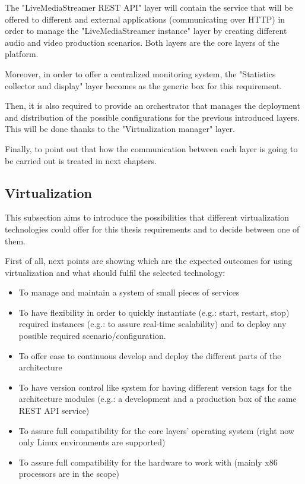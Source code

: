 The "LiveMediaStreamer REST API" layer will contain the service that will be offered to different and external applications (communicating over HTTP) in order to manage the "LiveMediaStreamer instance" layer by creating different audio and video production scenarios. Both layers are the core layers of the platform. 

Moreover, in order to offer a centralized monitoring system, the "Statistics collector and display" layer becomes as the generic box for this requirement.

Then, it is also required to provide an orchestrator that manages the deployment and distribution of the possible configurations for the previous introduced layers. This will be done thanks to the "Virtualization manager" layer.

Finally, to point out that how the communication between each layer is going to be carried out is treated in next chapters.

\subsection{Virtualization}

This subsection aims to introduce the possibilities that different virtualization technologies could offer for this thesis requirements and to decide between one of them.

First of all, next points are showing which are the expected outcomes for using virtualization and what should fulfil the selected technology:

\begin{itemize}
\item To manage and maintain a system of small pieces of services
\item To have flexibility in order to quickly instantiate (e.g.: start, restart, stop) required instances (e.g.: to assure real-time scalability) and to deploy any possible required scenario/configuration.
\item To offer ease to continuous develop and deploy the different parts of the architecture
\item To have version control like system for having different version tags for the architecture modules (e.g.: a development and a production box of the same REST API service)
\item To assure full compatibility for the core layers' operating system (right now only Linux environments are supported)
\item To assure full compatibility for the hardware to work with (mainly x86 processors are in the scope)
\end{itemize}

